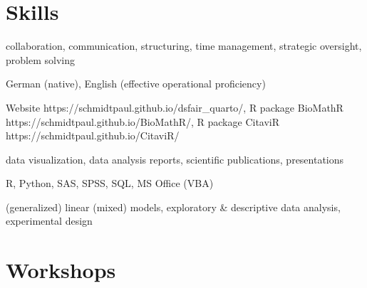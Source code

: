 \documentclass[11pt,a4paper,]{awesome-cv}
\begin{document}
\hypertarget{skills}{%
\section{Skills}\label{skills}}

\begin{cvskills} 
{collaboration, communication, structuring, time management, strategic oversight, problem solving } 

{German (native), English (effective operational proficiency) } 

{Website https://schmidtpaul.github.io/dsfair\_quarto/, R package BioMathR https://schmidtpaul.github.io/BioMathR/, R package CitaviR https://schmidtpaul.github.io/CitaviR/ } 

{data visualization, data analysis reports, scientific publications, presentations } 

{R, Python, SAS, SPSS, SQL, MS Office (VBA) } 

{(generalized) linear (mixed) models, exploratory \& descriptive data analysis, experimental design } 
\end{cvskills}

\hypertarget{workshops}{%
\section{Workshops}\label{workshops}}
\end{document}
